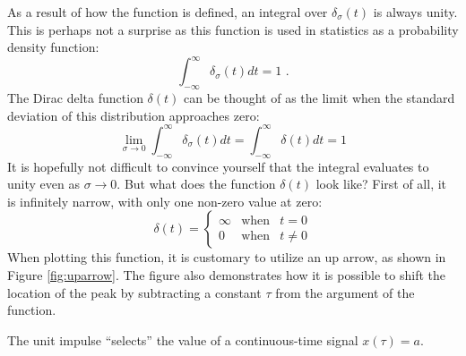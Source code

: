 As a result of how the function is defined, an integral over
$\delta_{\sigma}(t)$ is always unity. This is perhaps not a surprise
as this function is used in statistics as a probability density
function:
\begin{equation}
\int_{-\infty}^{\infty}\delta_\sigma(t)dt = 1 \,\,.
\end{equation}
The Dirac delta function $\delta(t)$ can be thought of as the limit when the standard deviation of this distribution approaches zero:
\begin{equation}
\lim_{\sigma\rightarrow 0}  \int_{-\infty}^{\infty} \delta_\sigma(t) dt = \int_{-\infty}^{\infty} \delta(t) dt = 1
\end{equation}
It is hopefully not difficult to convince yourself that the integral
evaluates to unity even as $\sigma \rightarrow 0$. But what does the
function $\delta(t)$ look like? First of all, it is infinitely narrow, with only one non-zero value at zero:
\begin{equation}
\delta(t) = \left\{ \begin{array}{ccc}
\infty & \mathrm{when} & t=0\\
0 &  \mathrm{when} & t \ne 0
\end{array}\right.
\end{equation}
When plotting this function, it is customary to utilize an up arrow, as shown in Figure \ref{fig:uparrow}. The figure also demonstrates how it is possible to shift the location of the peak by subtracting a constant $\tau$ from the argument of the function.

\begin{marginfigure}[0cm]
\begin{center}
\end{center}
\caption{The unit impulse ``selects'' the value of a continuous-time signal $x(\tau)=a$.}
\end{marginfigure}

